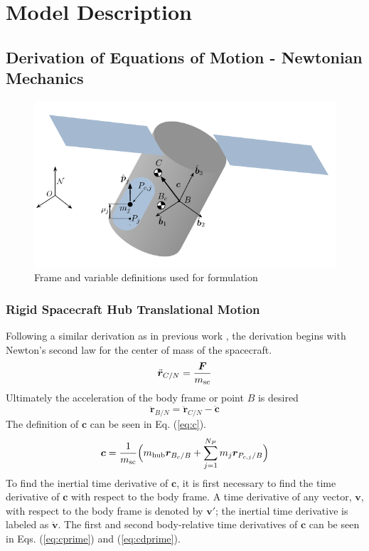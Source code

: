 \section{Model Description}


	\subsection{Derivation of Equations of Motion - Newtonian Mechanics}

\begin{figure}[H]
	\centering
	\includegraphics[]{Figures/Flex_Slosh_Figure}
	\caption{Frame and variable definitions used for formulation}
	\label{fig:Flex_Slosh_Figure}
\end{figure} 

\subsubsection{Rigid Spacecraft Hub Translational Motion}

Following a similar derivation as in previous work \cite{Allard2016rz}, the derivation begins with Newton's second law for the center of mass of the spacecraft.
\begin{equation}
	\ddot{\bm r}_{C/N} = \frac{\bm{F}}{m_{\text{\text{sc}}}}
	\label{eq:Newtons1Law}
\end{equation}
Ultimately the acceleration of the body frame or point $B$ is desired
\begin{equation}
	\ddot{\bm r}_{B/N} = \ddot{\bm r}_{C/N}-\ddot{\bm c}
	\label{eq:RcRbacc}
\end{equation}
The definition of $\bm{c}$ can be seen in Eq. (\ref{eq:c}).
\begin{equation}
	\bm{c} = \frac{1}{m_{\text{sc}}}\Big(m_{\text{\text{hub}}}\bm{r}_{B_{c}/B} + \sum_{j=1}^{N_{P}}m_j\bm{r}_{P_{c,j}/B}\Big)
	\label{eq:c} 
\end{equation}
To find the inertial time derivative of $\bm{c}$, it is first necessary to find the time derivative of $\bm{c}$ with respect to the body frame. A time derivative of any vector, $\bm{v}$, with respect to the body frame is denoted by $\bm{v}'$; the inertial time derivative is labeled as $\dot{\bm{v}}$. The first and second body-relative time derivatives of $\bm{c}$ can be seen in Eqs. (\ref{eq:cprime}) and (\ref{eq:cdprime}).

